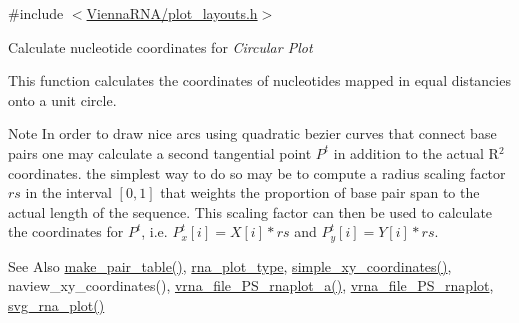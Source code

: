 {\ttfamily \#include $<$\hyperlink{plot__layouts_8h}{Vienna\-R\-N\-A/plot\-\_\-layouts.\-h}$>$}



Calculate nucleotide coordinates for {\itshape Circular Plot} 

This function calculates the coordinates of nucleotides mapped in equal distancies onto a unit circle.

\begin{DoxyNote}{Note}
In order to draw nice arcs using quadratic bezier curves that connect base pairs one may calculate a second tangential point $P^t$ in addition to the actual R$^{\mbox{2}}$  coordinates. the simplest way to do so may be to compute a radius scaling factor $rs$ in the interval $[0,1]$ that weights the proportion of base pair span to the actual length of the sequence. This scaling factor can then be used to calculate the coordinates for $P^t$, i.\-e. $ P^{t}_x[i] = X[i] * rs$ and $P^{t}_y[i] = Y[i] * rs$.
\end{DoxyNote}
\begin{DoxySeeAlso}{See Also}
\hyperlink{group__struct__utils_ga89c32307ee50a0026f4a3131fac0845a}{make\-\_\-pair\-\_\-table()}, \hyperlink{group__plotting__utils_ga5964c4581431b098b80027d6e14dcdd4}{rna\-\_\-plot\-\_\-type}, \hyperlink{group__plotting__utils_gaf4b9173e7d3fd361c3c85e6def194123}{simple\-\_\-xy\-\_\-coordinates()}, naview\-\_\-xy\-\_\-coordinates(), \hyperlink{group__plotting__utils_ga139a31dd0ba9fc6612431f67de901c31}{vrna\-\_\-file\-\_\-\-P\-S\-\_\-rnaplot\-\_\-a()}, \hyperlink{group__plotting__utils_gabdc8f6548ba4a3bc3cd868ccbcfdb86a}{vrna\-\_\-file\-\_\-\-P\-S\-\_\-rnaplot}, \hyperlink{group__plotting__utils_gae7853539b5df98f294b4af434e979304}{svg\-\_\-rna\-\_\-plot()}
\end{DoxySeeAlso}

